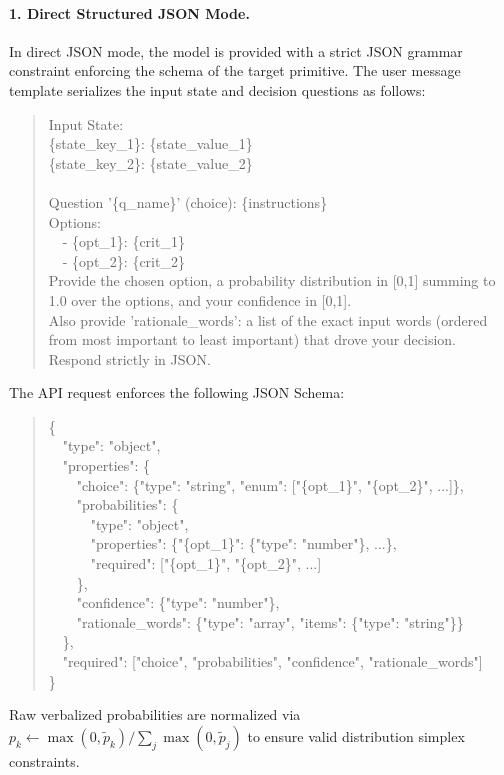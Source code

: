 \documentclass[10pt]{article}
\begin{document}
\paragraph{1. Direct Structured JSON Mode.}
In direct JSON mode, the model is provided with a strict JSON grammar constraint enforcing the schema of the target primitive.
The user message template serializes the input state and decision questions as follows:
\begin{quote}
\small\ttfamily
Input State:\\
\{state\_key\_1\}: \{state\_value\_1\}\\
\{state\_key\_2\}: \{state\_value\_2\}\\
\\
Question '\{q\_name\}' (choice): \{instructions\}\\
Options:\\
\ \ - \{opt\_1\}: \{crit\_1\}\\
\ \ - \{opt\_2\}: \{crit\_2\}\\
Provide the chosen option, a probability distribution in [0,1] summing to 1.0 over the options, and your confidence in [0,1].\\
Also provide 'rationale\_words': a list of the exact input words (ordered from most important to least important) that drove your decision.\\
Respond strictly in JSON.
\end{quote}
The API request enforces the following JSON Schema:
\begin{quote}
\small\ttfamily
\{\\
\ \ "type": "object",\\
\ \ "properties": \{\\
\ \ \ \ "choice": \{"type": "string", "enum": ["\{opt\_1\}", "\{opt\_2\}", ...]\},\\
\ \ \ \ "probabilities": \{\\
\ \ \ \ \ \ "type": "object",\\
\ \ \ \ \ \ "properties": \{"\{opt\_1\}": \{"type": "number"\}, ...\},\\
\ \ \ \ \ \ "required": ["\{opt\_1\}", "\{opt\_2\}", ...]\\
\ \ \ \ \},\\
\ \ \ \ "confidence": \{"type": "number"\},\\
\ \ \ \ "rationale\_words": \{"type": "array", "items": \{"type": "string"\}\}\\
\ \ \},\\
\ \ "required": ["choice", "probabilities", "confidence", "rationale\_words"]\\
\}
\end{quote}
Raw verbalized probabilities are normalized via $p_k \leftarrow \max(0, \tilde{p}_k) / \sum_{j} \max(0, \tilde{p}_j)$ to ensure valid distribution simplex constraints.
\end{document}

